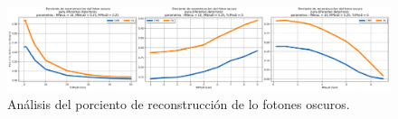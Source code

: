  
\begin{figure}[!ht]
    \centering
    \includegraphics[width=1\textwidth]{Simulacion/imagenes/Porciento_fotones_oscuros.png}
    \caption{Análisis del porciento de reconstrucción de lo fotones oscuros.}
    \label{}
\end{figure}


 
 
 
 